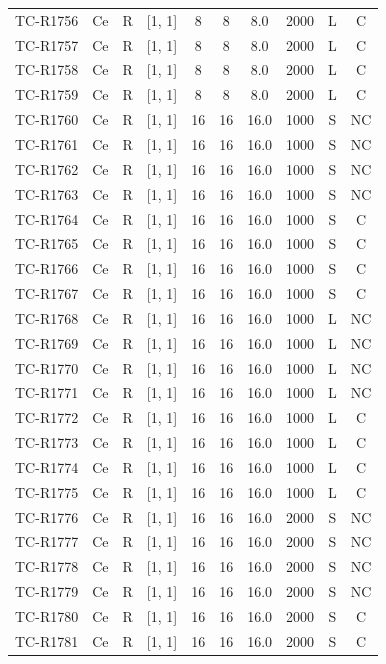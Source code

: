 \begin{longtable}{lccccccccc}
TC-R1756 & Ce & R & [1, 1] & 8 & 8 & 8.0 & 2000 & L & C \\
TC-R1757 & Ce & R & [1, 1] & 8 & 8 & 8.0 & 2000 & L & C \\
TC-R1758 & Ce & R & [1, 1] & 8 & 8 & 8.0 & 2000 & L & C \\
TC-R1759 & Ce & R & [1, 1] & 8 & 8 & 8.0 & 2000 & L & C \\
TC-R1760 & Ce & R & [1, 1] & 16 & 16 & 16.0 & 1000 & S & NC \\
TC-R1761 & Ce & R & [1, 1] & 16 & 16 & 16.0 & 1000 & S & NC \\
TC-R1762 & Ce & R & [1, 1] & 16 & 16 & 16.0 & 1000 & S & NC \\
TC-R1763 & Ce & R & [1, 1] & 16 & 16 & 16.0 & 1000 & S & NC \\
TC-R1764 & Ce & R & [1, 1] & 16 & 16 & 16.0 & 1000 & S & C \\
TC-R1765 & Ce & R & [1, 1] & 16 & 16 & 16.0 & 1000 & S & C \\
TC-R1766 & Ce & R & [1, 1] & 16 & 16 & 16.0 & 1000 & S & C \\
TC-R1767 & Ce & R & [1, 1] & 16 & 16 & 16.0 & 1000 & S & C \\
TC-R1768 & Ce & R & [1, 1] & 16 & 16 & 16.0 & 1000 & L & NC \\
TC-R1769 & Ce & R & [1, 1] & 16 & 16 & 16.0 & 1000 & L & NC \\
TC-R1770 & Ce & R & [1, 1] & 16 & 16 & 16.0 & 1000 & L & NC \\
TC-R1771 & Ce & R & [1, 1] & 16 & 16 & 16.0 & 1000 & L & NC \\
TC-R1772 & Ce & R & [1, 1] & 16 & 16 & 16.0 & 1000 & L & C \\
TC-R1773 & Ce & R & [1, 1] & 16 & 16 & 16.0 & 1000 & L & C \\
TC-R1774 & Ce & R & [1, 1] & 16 & 16 & 16.0 & 1000 & L & C \\
TC-R1775 & Ce & R & [1, 1] & 16 & 16 & 16.0 & 1000 & L & C \\
TC-R1776 & Ce & R & [1, 1] & 16 & 16 & 16.0 & 2000 & S & NC \\
TC-R1777 & Ce & R & [1, 1] & 16 & 16 & 16.0 & 2000 & S & NC \\
TC-R1778 & Ce & R & [1, 1] & 16 & 16 & 16.0 & 2000 & S & NC \\
TC-R1779 & Ce & R & [1, 1] & 16 & 16 & 16.0 & 2000 & S & NC \\
TC-R1780 & Ce & R & [1, 1] & 16 & 16 & 16.0 & 2000 & S & C \\
TC-R1781 & Ce & R & [1, 1] & 16 & 16 & 16.0 & 2000 & S & C \\

\end{longtable}
